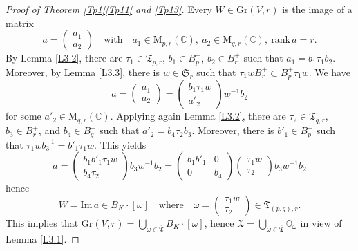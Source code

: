 \documentclass[11pt]{article}
\theoremstyle{definition}
\numberwithin{equation}{section}
\newcommand{\rank}{\mathrm{rank}}
\newcommand{\Mat}{\mathrm{M}}
\newcommand{\Xorbit}{\mathbb{O}}
\newcommand{\permutationsof}[1]{\mathfrak{S}_{#1}}
\newcommand{\ppermutationsof}{\mathfrak{T}}
\newcommand{\parameters}{\overline{\ppermutationsof}}
\newcommand{\Xfv}{\mathfrak{X}}
\newcommand{\Grass}{\mathrm{Gr}}
\newcommand{\mC}{\mathbb{C}}
\begin{document}
\begin{proof}[Proof of Theorem \ref{Tp1}\ref{Tp11} and \ref{Tp13}]
Every $W\in\Grass(V,r)$ is the image of a matrix
\[a=\begin{pmatrix} a_1\\ a_2 \end{pmatrix}\quad\mbox{with}\quad a_1\in\Mat_{p,r}(\mC),\ a_2\in\Mat_{q,r}(\mC),\ \rank\,a=r.\]
By Lemma \ref{L3.2}, there are $\tau_1\in \ppermutationsof_{p,r}$,
$b_1\in B_p^+$, $b_2\in B_r^+$ such that $a_1=b_1\tau_1b_2$. Moreover, by Lemma \ref{L3.3}, there is $w\in\permutationsof{r}$ such that $\tau_1wB_r^+\subset B_p^+\tau_1w$. We have
\[
a=\begin{pmatrix} a_1\\ a_2 \end{pmatrix}= \begin{pmatrix} b_1\tau_1w\\ a'_2\end{pmatrix}w^{-1}b_2
\]
for some $a'_2\in\Mat_{q,r}(\mC)$. Applying again Lemma \ref{L3.2}, there are $\tau_2\in\ppermutationsof_{q,r}$, $b_3\in B_r^+$, and $b_4\in B_q^+$ such that $a'_2=b_4\tau_2b_3$. Moreover, there is $b'_1\in B_p^+$ such that $\tau_1wb_3^{-1}=b'_1\tau_1w$. This yields
\[a=\begin{pmatrix} b_1b'_1\tau_1w\\ b_4\tau_2\end{pmatrix}b_3w^{-1}b_2=\begin{pmatrix} b_1b'_1 & 0\\ 0 & b_4\end{pmatrix}\begin{pmatrix}\tau_1w\\ \tau_2\end{pmatrix}b_3w^{-1}b_2\]
hence
\[
W=\mathrm{Im}\,a\in B_K\cdot[\omega]\quad\mbox{where}\quad \omega=\begin{pmatrix} \tau_1w\\ \tau_2\end{pmatrix}\in\ppermutationsof_{(p,q),r}.
\]
This implies that $\Grass(V,r)=\bigcup_{\omega\in\parameters}B_K\cdot[\omega]$, hence $\Xfv=\bigcup_{\omega\in\parameters}\Xorbit_\omega$ in view of Lemma \ref{L3.1}.


\end{proof}
\end{document}
